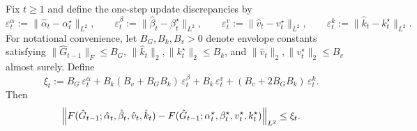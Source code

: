 










\begin{lemma}
\label{lem:gla_perturbation}
Fix $t \ge 1$ and define the one-step update discrepancies by
\begin{equation}
\varepsilon_t^\alpha := \|\hat\alpha_t-\alpha_t^\star\|_{L^2},\qquad
\varepsilon_t^\beta := \|\hat\beta_t-\beta_t^\star\|_{L^2},\qquad
\varepsilon_t^v := \|\hat v_t-v_t^\star\|_{L^2},\qquad
\varepsilon_t^k := \|\hat k_t-k_t^\star\|_{L^2}.
\label{eq:one_step_error_defs}
\end{equation}
For notational convenience, let $B_G,B_k,B_v>0$ denote envelope constants satisfying
$\|\hat G_{t-1}\|_F \le B_G$,
$\|\hat k_t\|_2,\|k_t^\star\|_2 \le B_k$, and
$\|\hat v_t\|_2,\|v_t^\star\|_2 \le B_v$
almost surely. Define
\begin{equation}
\xi_t
:=
B_G\,\varepsilon_t^\alpha
+
B_k(B_v+B_GB_k)\,\varepsilon_t^\beta
+
B_k\,\varepsilon_t^v
+
(B_v+2B_GB_k)\,\varepsilon_t^k.
\label{eq:xi_def}
\end{equation}
Then
\begin{equation}
\Bigl\|
F(\hat G_{t-1};\hat\alpha_t,\hat\beta_t,\hat v_t,\hat k_t)
-
F(\hat G_{t-1};\alpha_t^\star,\beta_t^\star,v_t^\star,k_t^\star)
\Bigr\|_{L^2}
\le
\xi_t.
\label{eq:one_step_perturbation}
\end{equation}
\end{lemma}






